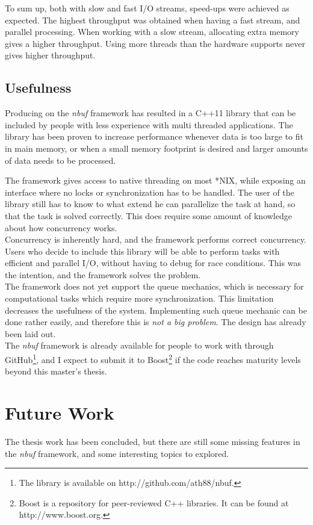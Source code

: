 \documentclass[a4paper]{article}
\newcommand{\nbuf}{\textit{nbuf} }
\begin{document}
To sum up, both with slow and fast I/O streams, speed-ups were achieved as expected. The highest throughput was obtained when having a fast stream, and parallel processing. When working with a slow stream, allocating extra memory gives a higher throughput. Using more threads than the hardware supports never gives higher throughput.


\subsection{Usefulness}
Producing on the \nbuf framework has resulted in a C++11 library that can be included by people with less experience with multi threaded applications. The library has been proven to increase performance whenever data is too large to fit in main memory, or when a small memory footprint is desired and larger amounts of data needs to be processed.

The framework gives access to native threading on most *NIX, while exposing an interface where no locks or synchronization has to be handled. The user of the library still has to know to what extend he can parallelize the task at hand, so that the task is solved correctly. This does require some amount of knowledge about how concurrency works.\\

Concurrency is inherently hard, and the framework performs correct concurrency. Users who decide to include this library will be able to perform tasks with efficient and parallel I/O, without having to debug for race conditions. This was the intention, and the framework solves the problem.\\

The framework does not yet support the queue mechanics, which is necessary for computational tasks which require more synchronization. This limitation decreases the usefulness of the system. Implementing such queue mechanic can be done rather easily, and therefore this is \textit{not a big problem}. The design has already been laid out.\\

The \nbuf framework is already available for people to work with through GitHub\footnote{The library is available on http://github.com/ath88/nbuf.}, and I expect to submit it to Boost\footnote{Boost is a repository for peer-reviewed C++ libraries. It can be found at http://www.boost.org.} if the code reaches maturity levels beyond this master's thesis.


\newpage
\section{Future Work}
The thesis work has been concluded, but there are still some missing features in the \nbuf framework, and some interesting topics to explored. 
\end{document}
